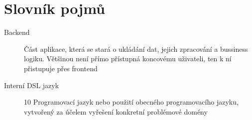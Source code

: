 \chapter{Slovník pojmů}
\begin{description} %
	\item[Backend] Část aplikace, která se stará o ukládání dat, jejich zpracování a bussiness logiku. Většinou není přímo přístupná koncovému uživateli, ten k ní přistupuje přes frontend
	\item[Interní DSL jazyk] 10 Programovací jazyk nebo použití obecného programovacího jazyku, vytvořený za účelem vyřešení konkretní problémové domény
\end{description}